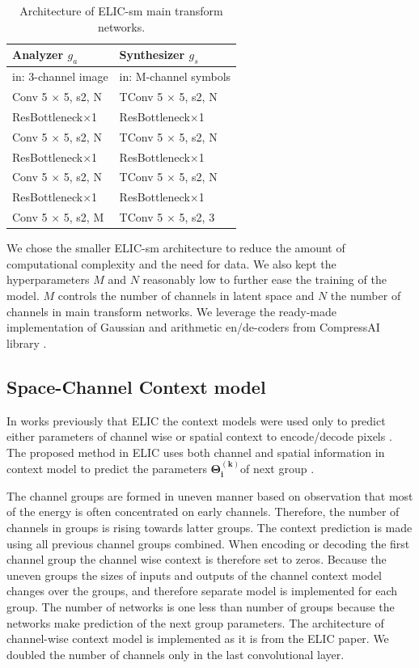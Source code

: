 \documentclass{article}
\begin{document}
\begin{table}[!h]
\label{table:architecture}
\begin{center}
\caption{Architecture of ELIC-sm main transform networks. \cite{ELIC}}
\begin{tabular}{l|l}
\hline
Analyzer $g_a$ & Synthesizer $g_s$ \\
\hline
in: 3-channel image & in: M-channel symbols \\
\hline
Conv 5 $\times$ 5, s2, N & TConv 5 $\times$ 5, s2, N \\
ResBottleneck$\times$1 & ResBottleneck$\times$1 \\
Conv 5 $\times$ 5, s2, N & TConv 5 $\times$ 5, s2, N \\
ResBottleneck$\times$1 & ResBottleneck$\times$1 \\
Conv 5 $\times$ 5, s2, N & TConv 5 $\times$ 5, s2, N \\
ResBottleneck$\times$1 & ResBottleneck$\times$1 \\
Conv 5 $\times$ 5, s2, M & TConv 5 $\times$ 5, s2, 3 \\
\hline
\end{tabular}
\end{center}
\end{table}

We chose the smaller ELIC-sm architecture to reduce the amount of computational complexity and the need for data. We also kept the hyperparameters $M$ and $N$ reasonably low to further ease the training of the model. $M$ controls the number of channels in latent space and $N$ the number of channels in main transform networks. We leverage the ready-made implementation of Gaussian and arithmetic en/de-coders from CompressAI library \cite{compressai}. 

\subsection{Space-Channel Context model}
In works previously that ELIC \cite{ELIC} the context models were used only to predict either parameters of channel wise or spatial context to encode/decode pixels \cite{balle2016, mbt2018, balle2018, checkerboard}. The proposed method in ELIC uses both channel and spatial information in context model to predict the parameters $\mathbf{\Theta_i^{(k)}}$of next group \cite{ELIC}. 

The channel groups are formed in uneven manner based on observation that most of the energy is often concentrated on early channels. Therefore, the number of channels in groups is rising towards latter groups. The context prediction is made using all previous channel groups combined. When encoding or decoding the first channel group the channel wise context is therefore set to zeros. Because the uneven groups the sizes of inputs and outputs of the channel context model changes over the groups, and therefore separate model is implemented for each group. The number of networks is one less than number of groups because the networks make prediction of the next group parameters. The architecture of channel-wise context model is implemented as it is from the ELIC paper. \cite{ELIC} We doubled the number of channels only in the last convolutional layer.
\end{document}
